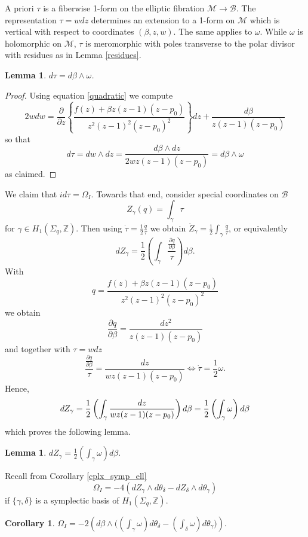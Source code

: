 \documentclass[12pt,letterpaper,reqno]{amsart}
\newtheorem{cor}[thm]{Corollary}
\newtheorem{lem}[thm]{Lemma}
\theoremstyle{remark}
\theoremstyle{definition}
\numberwithin{thm}{section}
\numberwithin{equation}{section}
\numberwithin{figure}{section}
\newcommand{\Z}{\ensuremath{\mathbb Z}}
\newcommand{\calM}{\mathcal M}
\begin{document}
A priori $\tau$ is a fiberwise 1-form on the elliptic fibration $\mathcal M \to \mathcal B$. The representation $\tau = w dz$ determines an extension to a 1-form on  $\mathcal M$ which is vertical with respect to coordinates $(\beta, z,w)$. The same applies to $\omega$. While $\omega$ is holomorphic on $\calM$, $\tau$ is meromorphic with poles transverse to the polar divisor with residues as in Lemma \ref{residues}.

\begin{lem}
$ d \tau = d\beta \wedge \omega$.	
\end{lem}
\begin{proof}
Using equation \eqref{quadratic} we compute
\[
2 w dw = \frac{\partial}{\partial z} \left\{\frac{f(z) + \beta z( z-1)(z-p_0)}{z^2(z-1)^2(z-p_0)^2}\right\}dz  + \frac{d\beta}{z(z-1)(z-p_0)}
\]
so that 
\[
d \tau  = dw \wedge dz = \frac{d\beta \wedge dz}{2w z (z-1)(z-p_0)} = d \beta \wedge \omega
\]
as claimed.
\end{proof}

We claim that $i d \tau = \Omega_I$. Towards that end, consider special coordinates on $\mathcal B$
\[
Z_\gamma(q) = \int_\gamma \tau
\]
for $\gamma \in H_1(\Sigma_q,\Z)$. Then using $\dot \tau = \frac{1}{2} \frac{\dot q}{\tau}$  we obtain $\dot{Z}_\gamma = \frac{1}{2} \int_\gamma \frac{\dot q}{\tau}$, or equivalently
\[
dZ_\gamma = \frac{1}{2} \left( \int_\gamma \frac{ \frac{\partial q}{\partial \beta}}{\tau} \right) d\beta .
\]
With
\[
q =  \frac{f(z) + \beta z( z-1)(z-p_0)}{z^2(z-1)^2(z-p_0)^2}
\]
we obtain
\[
\frac{\partial q}{\partial \beta} =\frac{dz^2}{z(z-1)(z-p_0)}
\]
and together with $ \tau = w dz$
\[
\frac{ \frac{\partial q}{\partial \beta}}{\tau} = \frac{dz}{w z(z-1)(z-p_0)} \Longleftrightarrow \dot \tau = \frac{1}{2} \omega .
\]
Hence,
\[
d Z_\gamma = \frac{1}{2} \left( \int_\gamma \frac{dz}{w z(z-1)(z-p_0)} \right) d\beta\\
= \frac 12 \left(\int_\gamma \omega\right) d\beta
\]
which proves the following lemma.
\begin{lem}
$
d Z_\gamma = \frac 12\left(\int_\gamma \omega \right) d\beta.
$
\end{lem}

Recall from Corollary \ref{cplx_symp_ell}
\[
\Omega_ I =  -4 (dZ_\gamma \wedge d\theta_\delta - dZ_\delta \wedge d\theta_\gamma)
\]
if $\{\gamma, \delta\}$ is a symplectic basis of $H_1(\Sigma_q,\Z)$.

\begin{cor}
$
\Omega_I = -2 \left(d \beta \wedge \bigl( \left( \int_\gamma \omega  \right) d\theta_\delta - \left( \int_\delta \omega \right) d\theta_\gamma \bigr) \right). 
$	
\end{cor}
\end{document}
